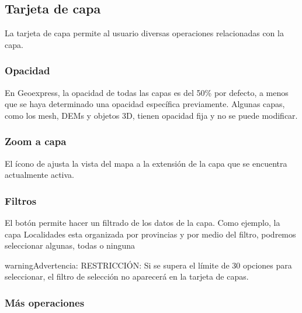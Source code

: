 \documentclass[a4paper,11pt,openany,spanish]{sphinxmanual}
\begin{document}
\subsection{Tarjeta de capa}
\label{\detokenize{navigation/cards:tarjeta-de-capa}}\label{\detokenize{navigation/cards::doc}}
\sphinxAtStartPar
La tarjeta de capa permite al usuario diversas operaciones relacionadas con la capa.


\subsubsection{Opacidad}
\label{\detokenize{navigation/cards:opacidad}}
\noindent{}

\sphinxAtStartPar
En Geoexpress, la opacidad de todas las capas es del 50\% por defecto, a menos que se haya determinado una opacidad específica previamente. Algunas capas, como los mesh, DEMs y objetos 3D, tienen opacidad fija y no se puede modificar.


\subsubsection{Zoom a capa}
\label{\detokenize{navigation/cards:zoom-a-capa}}
\noindent{}

\sphinxAtStartPar
El ícono de  ajusta la vista del mapa a la extensión de la capa que se encuentra actualmente activa.


\subsubsection{Filtros}
\label{\detokenize{navigation/cards:filtros}}
\noindent{}

\sphinxAtStartPar
El botón  permite hacer un filtrado de los datos de la capa. Como ejemplo, la capa Localidades esta organizada por provincias y por medio del filtro, podremos seleccionar algunas, todas o ninguna

\begin{sphinxadmonition}{warning}{Advertencia:}
\sphinxAtStartPar
RESTRICCIÓN: Si se supera el límite de 30 opciones para seleccionar, el filtro de selección no aparecerá en la tarjeta de capas.
\end{sphinxadmonition}


\subsubsection{Más operaciones}
\label{\detokenize{navigation/cards:mas-operaciones}}
\noindent{}
\end{document}
